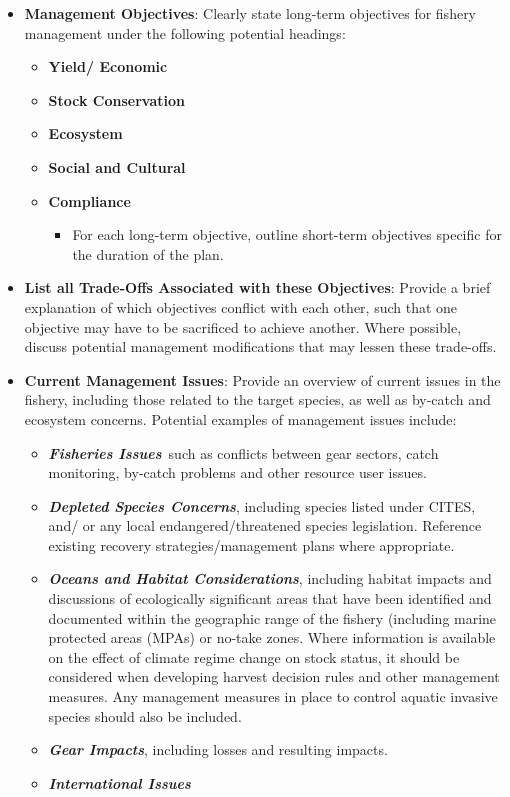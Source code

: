 \documentclass[]{book}
\providecommand{\tightlist}{%
  \setlength{\itemsep}{0pt}\setlength{\parskip}{0pt}}
\begin{document}
\begin{itemize}
\item
  \textbf{Management Objectives}: Clearly state long-term objectives for
  fishery management under the following potential headings:

  \begin{itemize}
  \item
    \textbf{Yield/ Economic}
  \item
    \textbf{Stock Conservation}
  \item
    \textbf{Ecosystem }
  \item
    \textbf{Social and Cultural}
  \item
    \textbf{Compliance}

    \begin{itemize}
    \tightlist
    \item
      For each long-term objective, outline short-term objectives
      specific for the duration of the plan.
    \end{itemize}
  \end{itemize}
\item
  \textbf{List all Trade-Offs Associated with these Objectives}: Provide
  a brief explanation of which objectives conflict with each other, such
  that one objective may have to be sacrificed to achieve another. Where
  possible, discuss potential management modifications that may lessen
  these trade-offs.
\item
  \textbf{Current Management Issues}: Provide an overview of current
  issues in the fishery, including those related to the target species,
  as well as by-catch and ecosystem concerns. Potential examples of
  management issues include:

  \begin{itemize}
  \item
    \textbf{\emph{Fisheries Issues}}~such as conflicts between gear
    sectors, catch monitoring, by-catch problems and other resource user
    issues.
  \item
    \textbf{\emph{Depleted Species Concerns}}, including species listed
    under CITES, and/ or any local endangered/threatened species
    legislation. Reference existing recovery strategies/management plans
    where appropriate.
  \item
    \textbf{\emph{Oceans and Habitat Considerations}}, including habitat
    impacts and discussions of ecologically significant areas that have
    been identified and documented within the geographic range of the
    fishery (including marine protected areas (MPAs) or no-take zones.
    Where information is available on the effect of climate regime
    change on stock status, it should be considered when developing
    harvest decision rules and other management measures. Any management
    measures in place to control aquatic invasive species should also be
    included.
  \item
    \textbf{\emph{Gear Impacts}}, including losses and resulting
    impacts.
  \item
    \textbf{\emph{International Issues}}
  \end{itemize}
\end{itemize}
\end{document}
